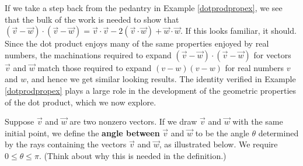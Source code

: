 If we take a step back from the pedantry in Example \ref{dotprodpropex}, we see that the bulk of the work is needed to show that $(\vec{v} - \vec{w}) \cdot (\vec{v} - \vec{w})  = \vec{v} \cdot \vec{v} -2(\vec{v} \cdot \vec{w}) + \vec{w}\cdot\vec{w}$.  If this looks familiar, it should. Since the dot product enjoys many of the same properties enjoyed by real numbers,  the machinations required to expand  $(\vec{v} - \vec{w}) \cdot (\vec{v} - \vec{w})$ for vectors $\vec{v}$ and $\vec{w}$ match those required to expand $(v-w)(v-w)$ for real numbers $v$ and $w$, and hence we get similar looking results.  The identity verified in Example \ref{dotprodpropex} plays a large role in the development of the geometric properties of the dot product, which we now explore.

\smallskip

Suppose $\vec{v}$ and $\vec{w}$ are two nonzero vectors.  If we draw $\vec{v}$ and $\vec{w}$ with the same initial point, we define the \textbf{angle between} $\vec{v}$ and $\vec{w}$ to be the angle $\theta$ determined by the rays containing the vectors $\vec{v}$ and $\vec{w}$, as illustrated below.  We require $0 \leq \theta \leq \pi$.  (Think about why this is needed in the definition.)

